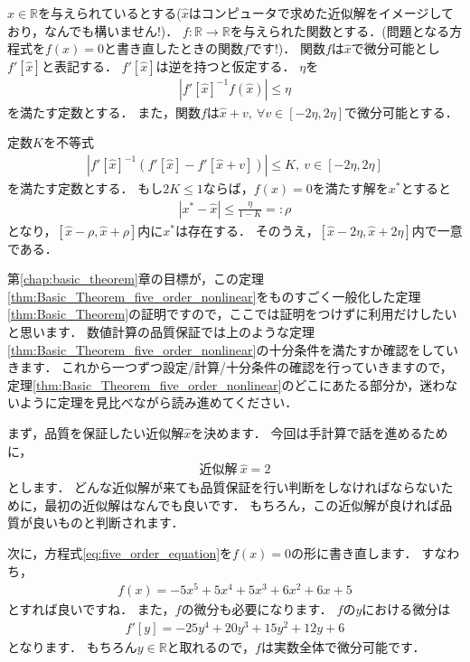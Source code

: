 \begin{Thm}\label{thm:Basic_Theorem_five_order_nonlinear}
	$\hat{x} \in {\mathbb R}$を与えられているとする($\hat{x}$はコンピュータで求めた近似解をイメージしており，なんでも構いません!)．
	$f:{\mathbb R} \rightarrow {\mathbb R}$を与えられた関数とする．(問題となる方程式を$f(x) = 0$と書き直したときの関数$f$です!)．	
	関数$f$は$\hat{x}$で微分可能とし$f'[\hat{x}]$と表記する．
	$f'[\hat{x}]$は逆を持つと仮定する．
	$\eta$を
	\begin{align*}
		| f'[\hat{x}]^{-1}f(\hat{x}) | \le \eta
	\end{align*}
	を満たす定数とする．
	また，関数$f$は$\hat{x} + v, ~ \forall v \in [-2 \eta, 2 \eta]$で微分可能とする．
	
	定数$K$を不等式
	\begin{align*}
	|  f'[\hat{x}]^{-1} \left( f'[\hat{x}] -  f'[\hat{x} + v] \right) | \le K, ~ v \in [-2 \eta, 2 \eta]
	\end{align*}
	を満たす定数とする．
	もし$2K\le 1$ならば，$f(x) = 0$を満たす解を$x^*$とすると
	\begin{align*}
		| x^* - \hat{x} | \le \frac{ \eta }{1 - K} =: \rho
	\end{align*}
	となり，$[ \hat{x} - \rho, \hat{x} + \rho ]$内に$x^*$は存在する．
	そのうえ，$[ \hat{x} - 2 \eta, \hat{x} + 2 \eta ]$内で一意である．
\end{Thm}


第\ref{chap:basic_theorem}章の目標が，この定理\ref{thm:Basic_Theorem_five_order_nonlinear}をものすごく一般化した定理\ref{thm:Basic_Theorem}の証明ですので，ここでは証明をつけずに利用だけしたいと思います．
数値計算の品質保証では上のような定理\ref{thm:Basic_Theorem_five_order_nonlinear}の十分条件を満たすか確認をしていきます．
これから一つずつ設定/計算/十分条件の確認を行っていきますので，定理\ref{thm:Basic_Theorem_five_order_nonlinear}のどこにあたる部分か，迷わないように定理を見比べながら読み進めてください．

まず，品質を保証したい近似解$\hat{x}$を決めます．
今回は手計算で話を進めるために，
\begin{align*}
	\mbox{近似解} ~ \hat{x} = 2
\end{align*}
とします．
どんな近似解が来ても品質保証を行い判断をしなければならないために，最初の近似解はなんでも良いです．
もちろん，この近似解が良ければ品質が良いものと判断されます．


次に，方程式\eqref{eq:five_order_equation}を$f(x) = 0$の形に書き直します．
すなわち，
\begin{align*}
	f(x) = -5 x^5 + 5 x^4 + 5 x^3 + 6 x^2 + 6x + 5
\end{align*}
とすれば良いですね．
また，$f$の微分も必要になります．
$f$の$y$における微分は
\begin{align*}
	f'[y] = -25 y^4 + 20 y^3 + 15 y^2 + 12 y + 6
\end{align*}
となります．
もちろん$y \in {\mathbb R}$と取れるので，$f$は実数全体で微分可能です．


